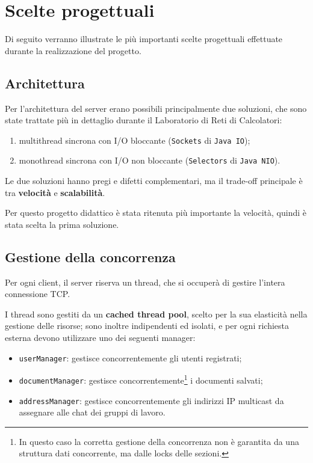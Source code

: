 \section{Scelte progettuali}
Di seguito verranno illustrate le più importanti scelte progettuali effettuate durante la realizzazione del progetto.

\subsection{Architettura}
\sloppy
Per l'architettura del server erano possibili principalmente due soluzioni, che sono state trattate più in dettaglio durante il Laboratorio di Reti di Calcolatori:
\begin{enumerate}
	\item multithread sincrona con I/O bloccante (\texttt{Sockets} di \texttt{Java IO});
	\item monothread sincrona con I/O non bloccante (\texttt{Selectors} di \texttt{Java NIO}).
\end{enumerate}
Le due soluzioni hanno pregi e difetti complementari, ma il trade-off principale è tra \textbf{velocità} e \textbf{scalabilità}.

Per questo progetto didattico è stata ritenuta più importante la velocità, quindi è stata scelta la prima soluzione.

\subsection{Gestione della concorrenza}
Per ogni client, il server riserva un thread, che si occuperà di gestire l'intera connessione TCP.

I thread sono gestiti da un \textbf{cached thread pool}, scelto per la sua elasticità nella gestione delle risorse; sono inoltre indipendenti ed isolati, e per ogni richiesta esterna devono utilizzare uno dei seguenti manager:
\begin{itemize}
	\item \texttt{userManager}: gestisce concorrentemente gli utenti registrati;
	\item \texttt{documentManager}: gestisce concorrentemente\footnote{In questo caso la corretta gestione della concorrenza non è garantita da una struttura dati concorrente, ma dalle locks delle sezioni.} i documenti salvati;
	\item \texttt{addressManager}: gestisce concorrentemente gli indirizzi IP multicast da assegnare alle chat dei gruppi di lavoro.
\end{itemize}
